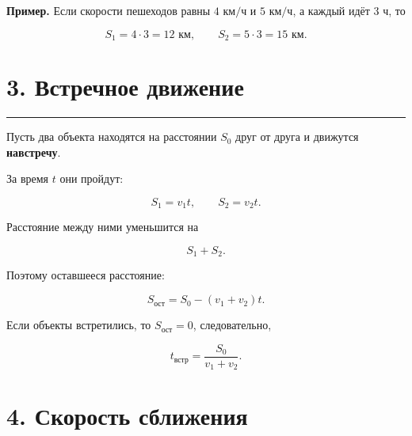 \documentclass[a4paper,12pt]{article}
\newcommand{\km}{\text{ км}}
\newcommand{\kmh}{\text{ км/ч}}
\newcommand{\hour}{\text{ ч}}
\newcommand{\sectionline}{
    \vspace{-0.2em}
    {\color{linegray}\rule{\linewidth}{0.5pt}}
    \vspace{0.5em}
}
\newcommand{\key}[1]{\textcolor{darkaccent}{\textbf{#1}}}
\begin{document}
\textbf{Пример.}
Если скорости пешеходов равны \(4\kmh\) и \(5\kmh\), а каждый идёт
\(3\hour\), то

\[
S_1=4\cdot3=12\km,
\qquad
S_2=5\cdot3=15\km.
\]


\section*{\textcolor{darkaccent}{3. Встречное движение}}

\sectionline

Пусть два объекта находятся на расстоянии \(S_0\) друг от друга и
движутся \key{навстречу}.

\begin{center}
\end{center}

За время \(t\) они пройдут:

\[
S_1=v_1t,
\qquad
S_2=v_2t.
\]

Расстояние между ними уменьшится на

\[
S_1+S_2.
\]

Поэтому оставшееся расстояние:

\[
\boxed{S_{\text{ост}}=S_0-(v_1+v_2)t}.
\]

Если объекты встретились, то \(S_{\text{ост}}=0\), следовательно,

\[
\boxed{t_{\text{встр}}=\frac{S_0}{v_1+v_2}}.
\]


\section*{\textcolor{darkaccent}{4. Скорость сближения}}
\end{document}

